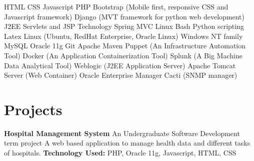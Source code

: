 \documentclass[11pt,a4paper,sans]{moderncv}
\begin{document}
{
HTML
\newline CSS
\newline Javascript
\newline PHP
\newline Bootstrap (Mobile first, responsive CSS and Javascript framework)
\newline Django (MVT framework for python web development)
\newline J2EE Servlets and JSP Technology
\newline Spring MVC
}
{
Linux Bash
\newline Python scripting
\newline Latex
}
{
Linux (Ubuntu, RedHat Enterprise, Oracle Linux)
\newline Windows NT family
}
{
MySQL
\newline Oracle 11g
}
{
Git
}
{
Apache Maven
}
{
Puppet (An Infrastructure Automation Tool)
\newline Docker (An Application Containerization Tool)
\newline Splunk (A Big Machine Data Analytical Tool)
\newline Weblogic (J2EE Application Server)
\newline Apache Tomcat Server (Web Container)
\newline Oracle Enterprise Manager
\newline Cacti (SNMP manager)
}


\section{Projects}
{
\textbf{Hospital Management System}
\newline
An Undergraduate Software Development term project \newline
A web based application to manage health data and different tasks of hospitals.
\newline \textbf{Technology Used: } PHP, Oracle 11g, Javascript, HTML, CSS
\newline}

\end{document}
